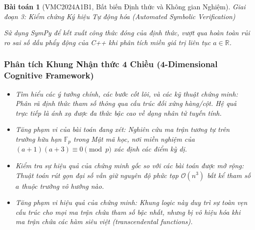 \documentclass{article}
\newtheorem{baitoan}{Bài toán}
\begin{document}
\begin{baitoan}[VMC2024A1B1, Bất biến Định thức và Không gian Nghiệm]


\vspace{0.5em}\noindent\emph{Giai đoạn 3: Kiểm chứng Ký hiệu Tự động hóa (Automated Symbolic Verification)}
 
 Sử dụng \textsf{SymPy} để kết xuất công thức đóng của định thức, vượt qua hoàn toàn rủi ro sai số dấu phẩy động của C++ khi phân tích miền giá trị liên tục $a \in \mathbb{R}$.



 \subsubsection*{Phân tích Khung Nhận thức 4 Chiều (4-Dimensional Cognitive Framework)}
 \begin{itemize}
 \item \textit{Tìm hiểu các ý tưởng chính, các bước cốt lõi, và các kỹ thuật chứng minh}: Phân rã định thức tham số thông qua cấu trúc đối xứng hàng/cột. Hệ quả trực tiếp là ánh xạ được đa thức bậc cao về dạng nhân tử tuyến tính.
 \item \textit{Tăng phạm vi của bài toán đang xét}: Nghiên cứu ma trận tương tự trên trường hữu hạn $\mathbb{F}_p$ trong Mật mã học, nơi miền nghiệm của $(a+1)(a+3) \equiv 0 \pmod p$ xác định các điểm kỳ dị.
 \item \textit{Kiểm tra sự hiệu quả của chứng minh gốc so với các bài toán được mở rộng}: Thuật toán rút gọn đại số vẫn giữ nguyên độ phức tạp $\mathcal{O}(n^3)$ bất kể tham số $a$ thuộc trường vô hướng nào.
 \item \textit{Tăng phạm vi hiệu quả của chứng minh}: Khung logic này duy trì sự toàn vẹn cấu trúc cho mọi ma trận chứa tham số bậc nhất, nhưng bị vô hiệu hóa khi ma trận chứa các hàm siêu việt (transcendental functions).
 \end{itemize}
\end{baitoan}

\end{document}
